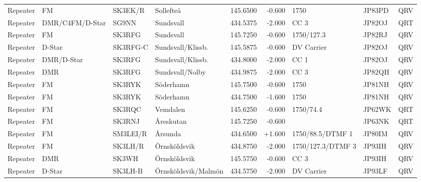 {\begin{landscape}
\begin{longtable}{llllrrlll}
	Repeater          & FM              & SK3EK/R  & Sollefteå           &     145.6500 &     -0.600 & 1750               & JP83PD      & QRV      \\
	Repeater          & DMR/C4FM/D-Star & SG9NN    & Sundsvall           &     434.5375 &     -2.000 & CC 3               & JP82OJ      & QRT      \\
	Repeater          & FM              & SK3RFG   & Sundsvall           &     145.7250 &     -0.600 & 1750/127.3         & JP82RJ      & QRV      \\
	Repeater          & D-Star          & SK3RFG-C & Sundsvall/Klissb.   &     145.5875 &     -0.600 & DV Carrier         & JP82OJ      & QRV      \\
	Repeater          & DMR/D-Star      & SK3RFG   & Sundsvall/Klissb.   &     434.8000 &     -2.000 & CC 1               & JP82OJ      & QRV      \\
	Repeater          & DMR             & SK3RFG   & Sundsvall/Nolby     &     434.9875 &     -2.000 & CC 3               & JP82QH      & QRV      \\
	Repeater          & FM              & SK3RYK   & Söderhamn           &     145.7500 &     -0.600 & 1750               & JP81NH      & QRV      \\
	Repeater          & FM              & SK3RYK   & Söderhamn           &     434.7500 &     -1.600 & 1750               & JP81NH      & QRV      \\
	Repeater          & FM              & SK3RQC   & Vemdalen            &     145.6250 &     -0.600 & 1750/74.4          & JP62WK      & QRT      \\
	Repeater          & FM              & SK3RNJ   & Åreskutan           &     145.7250 &     -0.600 &                    & JP63NK      & QRT      \\
	Repeater          & FM              & SM3LEI/R & Årsunda             &     434.6500 &     +1.600 & 1750/88.5/DTMF 1   & JP80IM      & QRV      \\
	Repeater          & FM              & SK3LH/R  & Örnsköldsvik        &     434.8750 &     -2.000 & 1750/127.3/DTMF 3  & JP93IH      & QRV      \\
	Repeater          & DMR             & SK3WH    & Örnsköldsvik        &     145.5750 &     -0.600 & CC 3               & JP93IH      & QRV      \\
	Repeater          & D-Star          & SK3LH-B  & Örnsköldsvik/Malmön &     434.5750 &     -2.000 & DV Carrier         & JP93LF      & QRV      \\

\end{longtable}
\end{landscape}}
